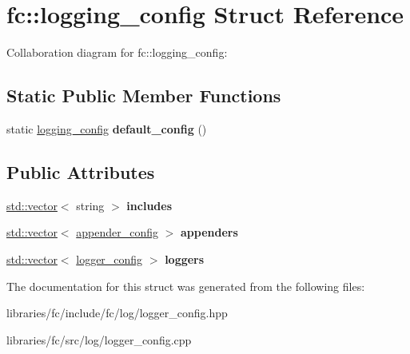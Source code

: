 \hypertarget{structfc_1_1logging__config}{}\section{fc\+:\+:logging\+\_\+config Struct Reference}
\label{structfc_1_1logging__config}


Collaboration diagram for fc\+:\+:logging\+\_\+config\+:
\subsection*{Static Public Member Functions}
\begin{DoxyCompactItemize}
\item 
\mbox{\label{structfc_1_1logging__config_a8af01d185dda6259354f127c526902d5}} 
static \mbox{\hyperlink{structfc_1_1logging__config}{logging\+\_\+config}} {\bfseries default\+\_\+config} ()
\end{DoxyCompactItemize}
\subsection*{Public Attributes}
\begin{DoxyCompactItemize}
\item 
\mbox{\label{structfc_1_1logging__config_a7e30a543b2d4aec4324c6ec958a2dd13}} 
\mbox{\hyperlink{classstd_1_1vector}{std\+::vector}}$<$ string $>$ {\bfseries includes}
\item 
\mbox{\label{structfc_1_1logging__config_ab703540d495cdbc67828de6b6dd6aec3}} 
\mbox{\hyperlink{classstd_1_1vector}{std\+::vector}}$<$ \mbox{\hyperlink{structfc_1_1appender__config}{appender\+\_\+config}} $>$ {\bfseries appenders}
\item 
\mbox{\label{structfc_1_1logging__config_a1a9da85cddeca8c8997bd666e7b29784}} 
\mbox{\hyperlink{classstd_1_1vector}{std\+::vector}}$<$ \mbox{\hyperlink{structfc_1_1logger__config}{logger\+\_\+config}} $>$ {\bfseries loggers}
\end{DoxyCompactItemize}


The documentation for this struct was generated from the following files\+:\begin{DoxyCompactItemize}
\item 
libraries/fc/include/fc/log/logger\+\_\+config.\+hpp\item 
libraries/fc/src/log/logger\+\_\+config.\+cpp\end{DoxyCompactItemize}
